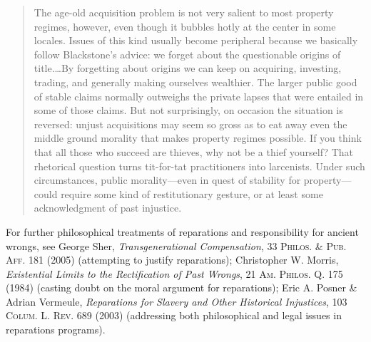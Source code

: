 \begin{quotation}
The age-old acquisition problem is not very salient to most property regimes,
however, even though it bubbles hotly at the center in some locales. Issues of
this kind usually become peripheral because we basically follow Blackstone's
advice: we forget about the questionable origins of title.\ldots By forgetting
about origins we can keep on acquiring, investing, trading, and generally making
ourselves wealthier. The larger public good of stable claims normally outweighs
the private lapses that were entailed in some of those claims. But not
surprisingly, on occasion the situation is reversed: unjust acquisitions may
seem so gross as to eat away even the middle ground morality that makes property
regimes possible. If you think that all those who succeed are thieves, why not
be a thief yourself? That rhetorical question turns tit-for-tat practitioners
into larcenists. Under such circumstances, public morality---even in quest of
stability for property---could require some kind of restitutionary gesture, or
at least some acknowledgment of past injustice. 
\end{quotation}

For further philosophical treatments of reparations and responsibility for
ancient wrongs, see George Sher, \textit{Transgenerational Compensation}, 33
\textsc{Philos. \& Pub. Aff.} 181 (2005) (attempting to justify reparations);
Christopher W. Morris, \textit{Existential Limits to the Rectification of Past
Wrongs}, 21 \textsc{Am. Philos. Q.} 175 (1984) (casting doubt on the moral
argument for reparations); Eric A. Posner \& Adrian Vermeule,
\textit{Reparations for Slavery and Other Historical Injustices}, 103
\textsc{Colum. L. Rev.} 689 (2003) (addressing both philosophical and legal
issues in reparations programs).


